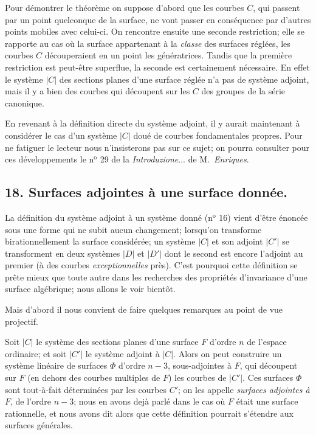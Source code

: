 \documentclass{article}
\begin{document}
Pour démontrer le théorème on suppose d'abord que les courbes $C$, qui passent par un point quelconque de la surface, ne vont passer en conséquence par d'autres points mobiles avec celui-ci. On rencontre ensuite une seconde restriction; elle se rapporte au cas où la surface appartenant à la \emph{classe} des surfaces réglées, les courbes $C$ découperaient en un point les génératrices. Tandis que la première restriction est peut-être superflue, la seconde est certainement nécessaire. En effet le système $|C|$ des sections planes d'une surface réglée n'a pas de système adjoint, mais il y a bien des courbes qui découpent sur les $C$ des groupes de la série canonique.

En revenant à la définition directe du système adjoint, il y aurait maintenant à considérer le cas d'un système $|C|$ doué de courbes fondamentales propres. Pour ne fatiguer le lecteur nous n'insisterons pas sur ce sujet; on pourra consulter pour ces développements le n${}^{\text{o}}$ 29 de la \emph{Introduzione}... de M.\ \emph{Enriques}.


\subsection*{18. Surfaces adjointes à une surface donnée.}

La définition du système adjoint à un système donné (n${}^{\text{o}}$ 16) vient d'être énoncée sous une forme qui ne subit aucun changement; lorsqu'on transforme birationnellement la surface considérée; un système $|C|$ et son adjoint $|C'|$ se transforment en deux systèmes $|D|$ et $|D'|$ dont le second est encore l'adjoint au premier (à des courbes \emph{exceptionnelles} près). C'est pourquoi cette définition se prête mieux que toute autre dans les recherches des propriétés d'invariance d'une surface algébrique; nous allons le voir bientôt.

Mais d'abord il nous convient de faire quelques remarques au point de vue projectif.

Soit $|C|$ le système des sections planes d'une surface $F$ d'ordre $n$ de l'espace ordinaire; et soit $|C'|$ le système adjoint à $|C|$. Alors on peut construire un système linéaire de surfaces $\Phi$ d'ordre $n - 3$, sous-adjointes à $F$, qui découpent sur $F$ (en dehors des courbes multiples de $F$) les courbes de $|C'|$. Ces surfaces $\Phi$ sont tout-à-fait déterminées par les courbes $C'$; on les appelle \emph{surfaces adjointes à $F$}, de l'ordre $n - 3$; nous en avons dejà parlé dans le cas où $F$ était une surface rationnelle, et nous avons dit alors que cette définition pourrait s'étendre aux surfaces générales.
\end{document}
